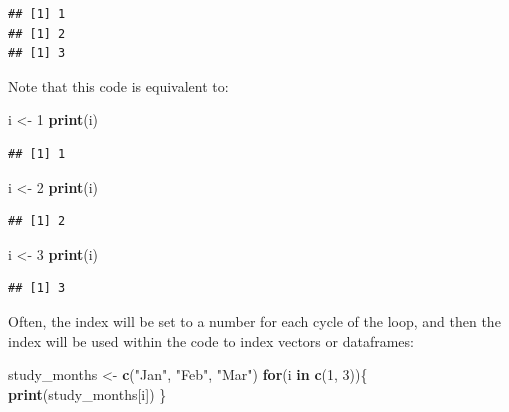 \documentclass[]{book}
\makeatletter
\newenvironment{Shaded}{\begin{snugshade}}{\end{snugshade}}
\newcommand{\KeywordTok}[1]{\textcolor[rgb]{0.13,0.29,0.53}{\textbf{#1}}}
\newcommand{\DecValTok}[1]{\textcolor[rgb]{0.00,0.00,0.81}{#1}}
\newcommand{\StringTok}[1]{\textcolor[rgb]{0.31,0.60,0.02}{#1}}
\newcommand{\ControlFlowTok}[1]{\textcolor[rgb]{0.13,0.29,0.53}{\textbf{#1}}}
\newcommand{\NormalTok}[1]{#1}
\newenvironment{kframe}{%
\medskip{}
\setlength{\fboxsep}{.8em}
 \def\at@end@of@kframe{}%
 \ifinner\ifhmode%
  \def\at@end@of@kframe{\end{minipage}}%
  \begin{minipage}{\columnwidth}%
 \fi\fi%
 \def\FrameCommand##1{\hskip\@totalleftmargin \hskip-\fboxsep
 \colorbox{shadecolor}{##1}\hskip-\fboxsep
     \hskip-\linewidth \hskip-\@totalleftmargin \hskip\columnwidth}%
 \MakeFramed {\advance\hsize-\width
   \@totalleftmargin\z@ \linewidth\hsize
   \@setminipage}}%
 {\par\unskip\endMakeFramed%
 \at@end@of@kframe}
\renewenvironment{Shaded}{\begin{kframe}}{\end{kframe}}
\theoremstyle{definition}
\theoremstyle{definition}
\theoremstyle{definition}
\theoremstyle{remark}
\makeatother
\begin{document}
\begin{verbatim}
## [1] 1
## [1] 2
## [1] 3
\end{verbatim}

Note that this code is equivalent to:

\begin{Shaded}
\begin{Highlighting}[]
\NormalTok{i <-}\StringTok{ }\DecValTok{1}
\KeywordTok{print}\NormalTok{(i)}
\end{Highlighting}
\end{Shaded}

\begin{verbatim}
## [1] 1
\end{verbatim}

\begin{Shaded}
\begin{Highlighting}[]
\NormalTok{i <-}\StringTok{ }\DecValTok{2}
\KeywordTok{print}\NormalTok{(i)}
\end{Highlighting}
\end{Shaded}

\begin{verbatim}
## [1] 2
\end{verbatim}

\begin{Shaded}
\begin{Highlighting}[]
\NormalTok{i <-}\StringTok{ }\DecValTok{3}
\KeywordTok{print}\NormalTok{(i)}
\end{Highlighting}
\end{Shaded}

\begin{verbatim}
## [1] 3
\end{verbatim}

Often, the index will be set to a number for each cycle of the loop, and
then the index will be used within the code to index vectors or
dataframes:

\begin{Shaded}
\begin{Highlighting}[]
\NormalTok{study_months <-}\StringTok{ }\KeywordTok{c}\NormalTok{(}\StringTok{"Jan"}\NormalTok{, }\StringTok{"Feb"}\NormalTok{, }\StringTok{"Mar"}\NormalTok{)}
\ControlFlowTok{for}\NormalTok{(i }\ControlFlowTok{in} \KeywordTok{c}\NormalTok{(}\DecValTok{1}\NormalTok{, }\DecValTok{3}\NormalTok{))\{}
        \KeywordTok{print}\NormalTok{(study_months[i])}
\NormalTok{\}}
\end{Highlighting}
\end{Shaded}
\end{document}
